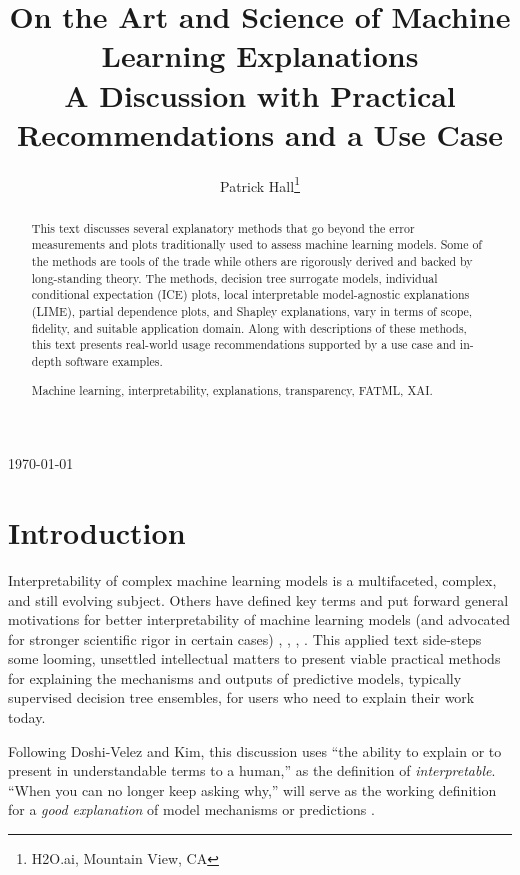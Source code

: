 \documentclass[11pt]{asaproc}
\title{On the Art and Science of Machine Learning Explanations\\\vspace{5pt}\small{A Discussion with Practical Recommendations and a Use Case}}
\author{Patrick Hall\thanks{H2O.ai, Mountain View, CA}
}
\begin{document}
\maketitle
\centerline{\today}

\vspace{15pt}

\begin{abstract}

This text discusses several explanatory methods that go beyond the error measurements and plots 			traditionally used to assess machine learning models. Some of the methods are tools of the trade while others are rigorously derived and backed by long-standing theory. The methods, decision tree surrogate models, individual conditional expectation (ICE) plots, local interpretable model-agnostic explanations (LIME), partial dependence plots, and Shapley explanations, vary in terms of scope, fidelity, and suitable application domain.  Along with descriptions of these methods, this text presents real-world usage recommendations supported by a use case and in-depth software examples.

\begin{keywords}
Machine learning, interpretability, explanations, transparency, FATML, XAI.
\end{keywords}
\end{abstract}

\section{Introduction}

Interpretability of complex machine learning models is a multifaceted, complex, and still evolving subject. Others have defined key terms and put forward general motivations for better interpretability of machine learning models (and advocated for stronger scientific rigor in certain cases) \cite{been_kim1}, \cite{gilpin2018explaining}, \cite{guidotti2018survey}, \cite{lipton1}. This applied text side-steps some looming, unsettled intellectual matters to present viable practical methods for explaining the mechanisms and outputs of predictive models, typically supervised decision tree ensembles, for users who need to explain their work today. 

Following Doshi-Velez and Kim, this discussion uses ``the ability to explain or to present in understandable terms to a human,'' as the definition of \textit{interpretable}. ``When you can no longer keep asking why,'' will serve as the working definition for a \textit{good explanation} of model mechanisms or predictions \cite{gilpin2018explaining}. 
	
\end{document}
